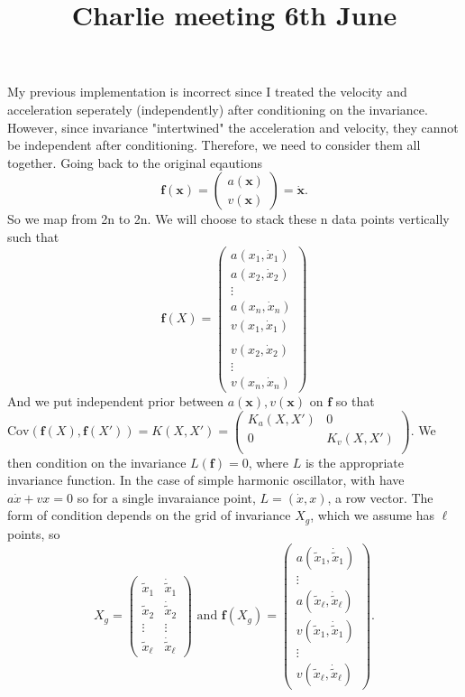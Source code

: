 \documentclass{article}
\title{\vspace{-3cm}Charlie meeting 6th June\vspace{-3em}}
\author{}
\date{}
\begin{document}
\maketitle
My previous implementation is incorrect since I treated the velocity and acceleration seperately (independently) after conditioning on the invariance. 
However, since invariance "intertwined" the acceleration and velocity, they cannot be independent after conditioning.
Therefore, we need to consider them all together.
Going back to the original eqautions
$$\mathbf{f}(\mathbf{x})=\begin{pmatrix}a(\mathbf{x})\\v(\mathbf{x})\end{pmatrix}=\mathbf{\dot{x}}.$$
So we map from 2n to 2n.
We will choose to stack these n data points vertically such that
$$\mathbf{f}(X)=\begin{pmatrix}
  a(x_1, \dot{x}_1) \\ a(x_2, \dot{x}_2) \\ \vdots\\ a(x_n, \dot{x}_n) \\ v(x_1, \dot{x}_1) \\ \\ v(x_2, \dot{x}_2)\\ \vdots \\ v(x_n, \dot{x}_n)
\end{pmatrix}$$
And we put independent prior between $a(\mathbf{x}), v(\mathbf{x})$ on $\mathbf{f}$ so that $\mathrm{Cov}(\mathbf{f}(X), \mathbf{f}(X'))=K(X, X') = \begin{pmatrix}
  K_a(X,X') & 0 \\ 0 & K_v(X,X')\\
\end{pmatrix}.$
We then condition on the invariance $L(\mathbf{f})=0$, where $L$ is the appropriate invariance function. 
In the case of simple harmonic oscillator, with have $a\dot{x}+vx=0$ so for a single invaraiance point, $L=\left(\dot{x},x\right)$, a row vector.
The form of condition depends on the grid of invariance $X_g$, which we assume has $\ell$ points, so $$X_g=\begin{pmatrix}
  \tilde{x}_1 & \dot{\tilde{x}}_1 \\ \tilde{x}_2 & \dot{\tilde{x}}_2  \\ \vdots & \vdots \\ \tilde{x}_{\ell} & \dot{\tilde{x}}_{\ell} 
\end{pmatrix} \text{ and } \mathbf{f}(X_g)=\begin{pmatrix}
  a(\tilde{x}_1, \dot{\tilde{x}}_1) \\ \vdots\\ a(\tilde{x}_{\ell}, \dot{\tilde{x}}_{\ell}) \\ v(\tilde{x}_1, \dot{\tilde{x}}_1) \\ \vdots \\ v(\tilde{x}_{\ell}, \dot{\tilde{x}}_{\ell})
\end{pmatrix}.$$
\end{document}
